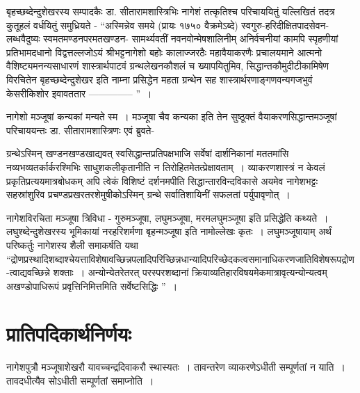 {बृहच्छब्देन्दुशेखरस्य सम्पादकैः डा. सीतारामशास्त्रिभिः नागेशं तत्कृतिश्च \break परिचाययितुं यल्लिखितं तदत्र कुतूहलं वर्धयितुं समुध्रियते - “अस्मिन्नेव समये (प्रायः १७५० वैक्रमेऽब्दे) स्वगुरु-हरिदीक्षितपादसेवन-लब्धवैदुष्यः स्वमतमण्डनपरमतखण्डन- सामर्थ्यवतीं नवनवोन्मेषशालिनीम् अनिर्वचनीयां कामपि स्पृहणीयां प्रतिभामदधानो विद्वत्तल्लजोऽयं श्रीभट्टनागेशो बहोः कालाज्जरठैः महावैयाकरणैः प्रचालयमाने आत्मनो वैशिष्ट्यमनन्य\-\break साधारणं शास्त्रार्थपाटवं ग्रन्थलेखनकौशलं च ख्यापयितुमिव, सिद्धान्तकौमुदीटीकामिषेण \-विरचितेन बृहच्छब्देन्दुशेखर इति नाम्ना प्रसिद्धेन महता ग्रन्थेन सह शास्त्रार्थरणाङ्गणवन्यगजभुवं केसरीकिशोर इवावततार -------------- ”~। 

नागेशो मञ्जूषां कन्यकां मन्यते स्म~। मञ्जूषा चैव कन्यका इति तेन सुष्ठूक्तं वैयाकरणसिद्धान्तमञ्जूषां परिचाययन्तः डा. सीतारामशास्त्रिणः एवं ब्रुवते- 

ग्रन्थेऽस्मिन् खण्डनखण्डखाद्यवत् स्वसिद्धान्तप्रतिपक्षभाजि सर्वेषां दार्शनिकानां मततमांसि नव्यभव्यतर्कार्करश्मिभिः साधुशकलीकृतानीति न तिरोहितमेतत्प्रेक्षावताम्~। व्याकरण\-शास्त्रं न केवलं प्रकृतिप्रत्ययमात्रबोधकम् अपि त्वेकं विशिष्टं दर्शनमपीति सिद्धान्तारविन्द\-विकासे अयमेव नागेशभट्टः सहस्रांशुरिव प्रचण्डप्रखरतरशेमुषीकोऽस्मिन् ग्रन्थे सर्वातिशायिनीं सफलतां पर्युपावृणोत्~। 

नागेशविरचिता मञ्जूषा त्रिविधा - गुरुमञ्जूषा, लघुमञ्जूषा, मरमलघुमञ्जूषा इति प्रसिद्धेति कथ्यते~। लघुश्ब्देन्दुशेखरस्य भूमिकायां नरहरिशर्मणा बृहन्मञ्जूषा इति नामोल्लेखः कृतः~। \hbox{लघुमञ्जूषायाम्} अर्थं परिष्कर्तुः नागेशस्य शैली समाकर्षति यथा  “द्रोणप्रस्थादिशब्दाश्चेयत्ता\-विशेषावच्छिन्नपलादिपरिच्छिन्नधान्यादिपरिच्छेदकत्वसमानाधिकरणजातिविशेषरूपद्रोण-\break त्वाद्यवच्छिन्ने शक्ताः~। अन्योन्येतरेतरत् परस्परशब्दानां क्रियाव्यतिहारविषयमेकमात्रावृत्यन्योन्यत्वम् अखण्डोपाधिरूपं प्रवृत्तिनिमित्तमिति सर्वेष्टसिद्धिः ”~। 

\section*{प्रातिपदिकार्थनिर्णयः}

नागेशपुत्रौ मञ्जूषाशेखरौ यावच्चन्द्रदिवाकरौ स्थास्यतः~। तावन्तरेण व्याकरणेऽधीती सम्पूर्णतां न याति~। तावदधीत्यैव सोऽधीती सम्पूर्णतां समाप्नोति~। 

\articleend
}
